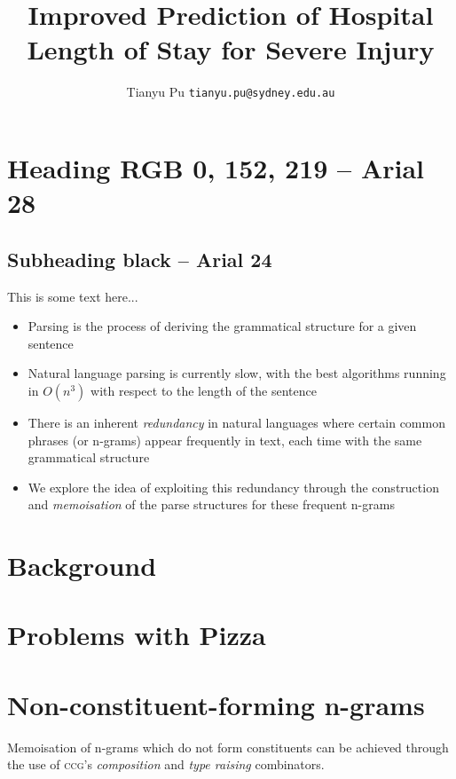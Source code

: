 \documentclass[landscape]{usydposter}
\title{Improved Prediction of Hospital Length of Stay for Severe Injury}
\author{Tianyu Pu \texttt{tianyu.pu@sydney.edu.au}}
\newcommand{\acronym}[1]{\textsc{#1}\xspace}
\newcommand{\ngram}{n-gram\xspace}
\newcommand{\ngrams}{{\ngram}s\xspace}
\newcommand{\ccg}{\acronym{ccg}}
\begin{document}
\makeheader

\begin{multicols}{3}

\section{Heading RGB 0, 152, 219 -- Arial 28}
\subsection{Subheading black -- Arial 24}
\noindent This is some text here...

\begin{itemize}
  \item Parsing is the process of deriving the grammatical structure for a given sentence
  \item Natural language parsing is currently slow, with the best algorithms running in $O(n^3)$ with respect to the length of the sentence
  \item There is an inherent \emph{redundancy} in natural languages where certain common phrases (or \ngrams) appear frequently in text, each time with the same grammatical structure
  \item We explore the idea of exploiting this redundancy through the construction and \emph{memoisation} of the parse structures for these frequent \ngrams
\end{itemize}


\section{Background}

\section{Problems with Pizza}

\section{Non-constituent-forming \ngrams}
Memoisation of \ngrams which do not form constituents can be achieved through the use of {\ccg}'s \emph{composition} and \emph{type raising} combinators.


\end{multicols}
\end{document}
